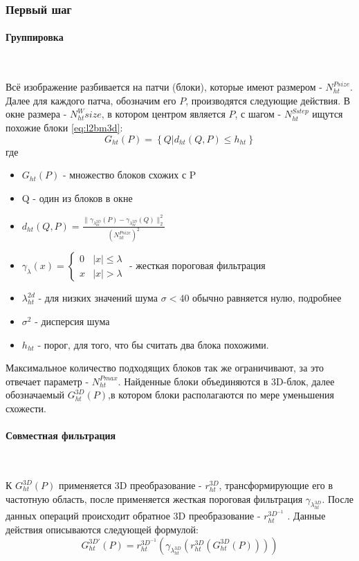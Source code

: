 \subsubsection{Первый шаг}
\paragraph{Группировка}\

Всё изображение разбивается на патчи (блоки), которые имеют размером - $N_{ht}^{Psize}$.  Далее для каждого патча, обозначим его $P$, производятся следующие действия. В окне размера - $N_{ht}^Wsize$, в котором центром является $P$, с шагом - $N_{ht}^{Sstep}$ ищутся похожие блоки  \ref{eq:l2bm3d}:
\begin{equation}\label{eq:l2bm3d}
	G_{ht}(P) = \left\{Q | d_{ht}(Q,P) \leq h_{ht}\right\}
\end{equation}
где
\begin{itemize}
	\item $G_{ht}(P)$ - множество блоков схожих с P
	\item Q - один из блоков в окне
	\item $d_{ht}(Q,P) = \frac{\parallel\gamma_{\lambda_{ht}^{2D}}(P)-\gamma_{\lambda_{ht}^{2D}}(Q)\parallel_2^2}{(N_{ht}^{Psize})^2}$
	\item $\gamma_{\lambda}(x) = \begin{cases}0 &|x| \leq \lambda\\ x & |x| > \lambda\end{cases}$ - жесткая пороговая фильтрация 
	\item $\lambda_{ht}^{2d}$ - для низких значений шума $\sigma < 40$ обычно равняется нулю, подробнее \cite{dabov}
	\item $\sigma^2$ -  дисперсия шума
	\item $h_{ht}$ - порог, для того, что бы считать два блока похожими.
\end{itemize}
Максимальное количество подходящих блоков так же ограничивают, за это отвечает параметр - $N_{ht}^{Pmax}$. Найденные блоки объединяются в 3D-блок, далее обозначаемый $G_{ht}^{3D}(P)$,в котором блоки располагаются по мере уменьшения схожести.

\paragraph{Совместная фильтрация}\

К $G_{ht}^{3D}(P)$ применяется 3D преобразование - $r_{ht}^{3D}$, трансформирующие его в частотную область, после применяется жесткая пороговая фильтрация $\gamma_{\lambda_{ht}^{3D}}$. После данных операций происходит обратное 3D преобразование - $r_{ht}^{3D^{-1}}$ . Данные действия описываются следующей формулой:
\begin{equation}
G_{ht}^{3D'}(P) = r_{ht}^{3D^{-1}}(\gamma_{\lambda_{ht}^{3D}}(r_{ht}^{3D}(G_{ht}^{3D}(P))))
\end{equation}


